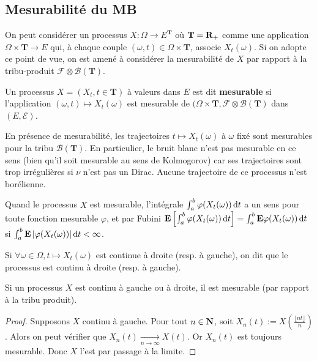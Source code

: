 \subsection{Mesurabilité du MB}

	On peut considérer un processus $X \colon \Omega \to E^{\mathbf{T}}$ où $\mathbf{T} = \mathbf{R}_+$ comme une application $\Omega \times \mathbf{T} \to E$ qui, à chaque couple $(\omega,t) \in \Omega \times \mathbf{T}$, associe $X_t(\omega)$.
	Si on adopte ce point de vue, on est amené à considérer la mesurabilité de $X$ par rapport à la tribu-produit $\mathcal{F} \otimes \mathcal{B}(\mathbf{T})$.
	
	\begin{defn}
		Un processus $X = (X_t, t \in \mathbf{T})$ à valeurs dans $E$ est dit \textbf{mesurable} si l'application $(\omega,t) \mapsto X_t(\omega)$ est mesurable de $(\Omega \times \mathbf{T}, \mathcal{F} \otimes \mathcal{B}(\mathbf{T})$ dans $(E,\mathcal{E})$.
	\end{defn}
	
	En présence de mesurabilité, les trajectoires $t \mapsto X_t(\omega)$ à $\omega$ fixé sont mesurables pour la tribu $\mathcal{B}(\mathbf{T})$.
	En particulier, le bruit blanc n'est pas mesurable en ce sens (bien qu'il soit mesurable au sens de Kolmogorov) car ses trajectoires sont trop irrégulières si $\nu$ n'est pas un Dirac.
	Aucune trajectoire de ce processus n'est borélienne.
	
	Quand le processus $X$ est mesurable, l'intégrale $\int_a^b \varphi(X_t(\omega)) \mathop{}\mathopen{}\mathrm{d} t$ a un sens pour toute fonction mesurable $\varphi$, et par Fubini $\mathbf{E} \left[ \int_a^b \varphi(X_t(\omega)) \mathop{}\mathopen{}\mathrm{d} t \right] = \int_a^b \mathbf{E} \varphi(X_t(\omega)) \mathop{}\mathopen{}\mathrm{d} t$ si $\int_a^b \mathbf{E} \left\lvert\varphi(X_t(\omega))\right\rvert \mathop{}\mathopen{}\mathrm{d} t < \infty$.
	
	\begin{note}
		Si $\forall \omega \in \Omega, t \mapsto X_t(\omega)$ est continue à droite (resp. à gauche), on dit que le processus est continu à droite (resp. à gauche).
	\end{note}
	
	\begin{pop}
		Si un processus $X$ est continu à gauche ou à droite, il est mesurable (par rapport à la tribu produit).
	\end{pop}
	
	\begin{proof}
		Supposons $X$ continu à gauche.
		Pour tout $n \in \mathbf{N}$, soit $X_n(t) := X \left( \frac{\lfloor nt \rfloor}{n} \right)$.
		Alors on peut vérifier que $X_n(t) \underset{n \to \infty}{\longrightarrow} X(t)$.
		Or $X_n(t)$ est toujours mesurable.
		Donc $X$ l'est par passage à la limite.
	\end{proof}
	
